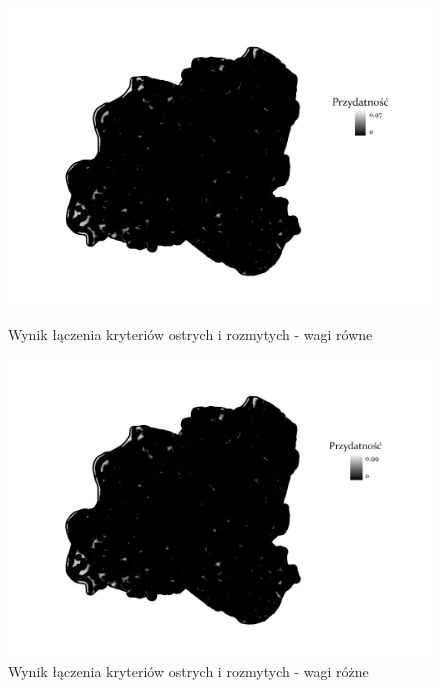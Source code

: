 \documentclass{article}
\begin{document}
\begin{figure}[H]
    \begin{minipage}[t]{0.48\textwidth}
        \centering
        \includegraphics[width=\linewidth]{img/plesna-wynik.jpg}
        \caption{Wynik łączenia kryteriów ostrych i rozmytych - wagi równe}
        \label{fig:wynik-rowne}
    \end{minipage}
    \hfill
    \begin{minipage}[t]{0.48\textwidth}
        \centering
        \includegraphics[width=\linewidth]{img/roznewagi-plesna-wynik.jpg}
        \caption{Wynik łączenia kryteriów ostrych i rozmytych - wagi różne}
        \label{fig:wynik-rozne}
    \end{minipage}
\end{figure}
\newpage
\end{document}
